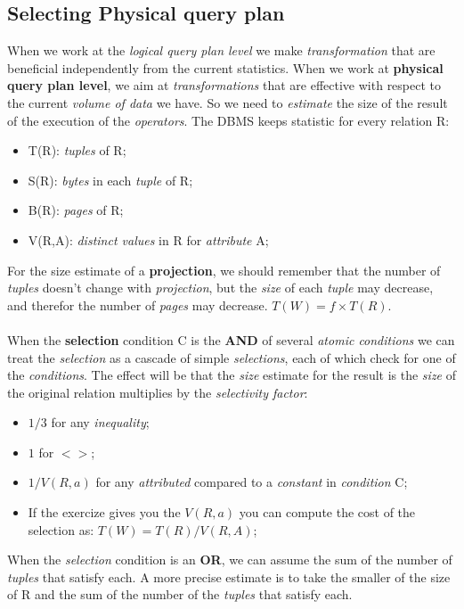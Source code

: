 \documentclass{article}
\begin{document}
\subsection{Selecting Physical query plan}
When we work at the \emph{logical query plan level} we make \emph{transformation} that are beneficial independently from the current statistics. When we work at \textbf{physical query plan level}, we aim at \emph{transformations} that are effective with respect to the current\emph{ volume of data} we have. So we need to \emph{estimate} the size of the result of the execution of the \emph{operators}. The DBMS keeps statistic for every relation R:
\begin{itemize}
\item T(R): \emph{tuples} of R;
\item S(R): \emph{bytes} in each \emph{tuple} of R;
\item B(R): \emph{pages} of R;
\item V(R,A): \emph{distinct values} in R for \emph{attribute} A;
\end{itemize}
For the size estimate of a \textbf{projection}, we should remember that the number of \emph{tuples} doesn't change with \emph{projection}, but the \emph{size} of each \emph{tuple} may decrease, and therefor the number of \emph{pages} may decrease. $T(W)= f \times T(R)$.\\\\
When the \textbf{selection} condition C is the \textbf{AND} of several \emph{atomic conditions} we can treat the \emph{selection} as a cascade of simple \emph{selections}, each of which check for one of the \emph{conditions}. The effect will be that the \emph{size} estimate for the result is the \emph{size} of the original relation multiplies by the \emph{selectivity factor}: 
\begin{itemize}
\item $1/3$ for any \emph{inequality};
\item $1$ for $<>$;
\item $1/V(R,a)$ for any \emph{attributed} compared to a \emph{constant} in \emph{condition} C;
\item If the exercize gives you the $V(R,a)$ you can compute the cost of the selection as: $T(W)= T(R)/V(R,A)$;
\end{itemize}
When the \emph{selection} condition is an \textbf{OR}, we can assume the sum of the number of \emph{tuples} that satisfy each. A more precise estimate is to take the smaller of the size of R and the sum of the number of the \emph{tuples} that satisfy each. 
\end{document}
